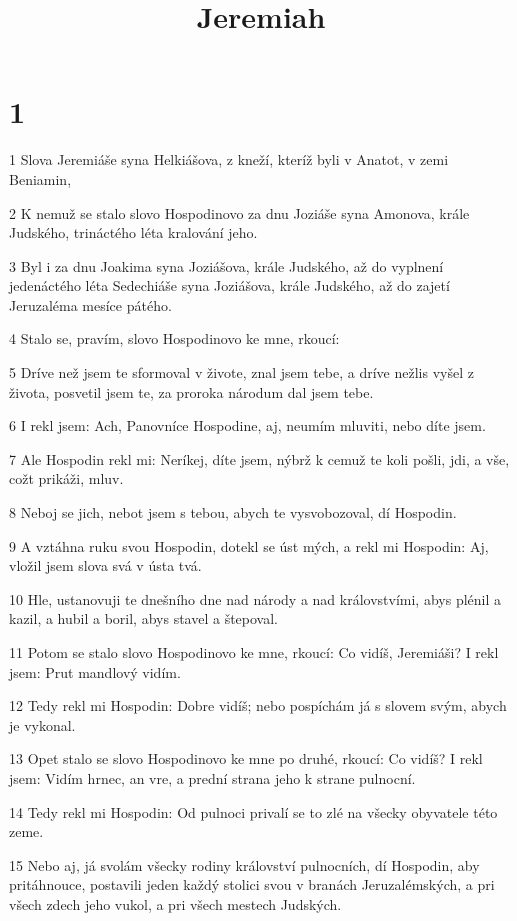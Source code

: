 

\title{Jeremiah}

\chapter{1}

\par 1 Slova Jeremiáše syna Helkiášova, z kneží, kteríž byli v Anatot, v zemi Beniamin,
\par 2 K nemuž se stalo slovo Hospodinovo za dnu Joziáše syna Amonova, krále Judského, trináctého léta kralování jeho.
\par 3 Byl i za dnu Joakima syna Joziášova, krále Judského, až do vyplnení jedenáctého léta Sedechiáše syna Joziášova, krále Judského, až do zajetí Jeruzaléma mesíce pátého.
\par 4 Stalo se, pravím, slovo Hospodinovo ke mne, rkoucí:
\par 5 Dríve než jsem te sformoval v živote, znal jsem tebe, a dríve nežlis vyšel z života, posvetil jsem te, za proroka národum dal jsem tebe.
\par 6 I rekl jsem: Ach, Panovníce Hospodine, aj, neumím mluviti, nebo díte jsem.
\par 7 Ale Hospodin rekl mi: Neríkej, díte jsem, nýbrž k cemuž te koli pošli, jdi, a vše, cožt prikáži, mluv.
\par 8 Neboj se jich, nebot jsem s tebou, abych te vysvobozoval, dí Hospodin.
\par 9 A vztáhna ruku svou Hospodin, dotekl se úst mých, a rekl mi Hospodin: Aj, vložil jsem slova svá v ústa tvá.
\par 10 Hle, ustanovuji te dnešního dne nad národy a nad královstvími, abys plénil a kazil, a hubil a boril, abys stavel a štepoval.
\par 11 Potom se stalo slovo Hospodinovo ke mne, rkoucí: Co vidíš, Jeremiáši? I rekl jsem: Prut mandlový vidím.
\par 12 Tedy rekl mi Hospodin: Dobre vidíš; nebo pospíchám já s slovem svým, abych je vykonal.
\par 13 Opet stalo se slovo Hospodinovo ke mne po druhé, rkoucí: Co vidíš? I rekl jsem: Vidím hrnec, an vre, a prední strana jeho k strane pulnocní.
\par 14 Tedy rekl mi Hospodin: Od pulnoci privalí se to zlé na všecky obyvatele této zeme.
\par 15 Nebo aj, já svolám všecky rodiny království pulnocních, dí Hospodin, aby pritáhnouce, postavili jeden každý stolici svou v branách Jeruzalémských, a pri všech zdech jeho vukol, a pri všech mestech Judských.
